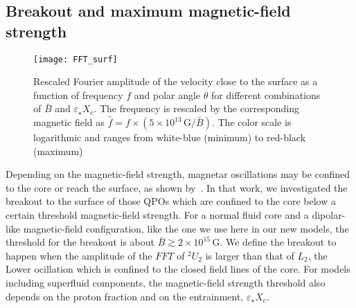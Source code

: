 \documentclass[useAMS,usenatbib]{mnras}
\begin{document}
\subsection{Breakout and maximum magnetic-field strength}
\label{sec_breakout}

\begin{figure*}
\texttt{[image: FFT\_surf]}
\caption{Rescaled Fourier amplitude of the velocity close to the surface as a 
function of frequency $f$ and polar angle $\theta$ for different combinations 
of 
$\bar B$ and $\varepsilon_\star X_c$. The frequency is rescaled by the 
corresponding magnetic field as $\hat f = f\times(5\times10^{13}\,\mathrm{G} / \bar B)$. 
The color scale is logarithmic and ranges from white-blue
(minimum) to red-black (maximum)}
\label{fig_FFT_surf}
\end{figure*}

Depending on the magnetic-field strength, magnetar oscillations may be confined 
to the core or reach the surface, as shown by~\cite{Gabler2012}. In that work, 
we 
investigated the breakout to the surface of those QPOs which are confined to 
the core below a certain threshold magnetic-field strength. For a normal fluid 
core and a dipolar-like magnetic-field configuration, like the one we use here 
in our new models, the threshold for the breakout is about $\bar B
\gtrsim2\times10^{15}\,$G. We define the breakout to happen when the amplitude 
of 
the $FFT$ of $^2U_2$ is larger than that of $L_2$, the Lower ocillation which 
is confined to the closed field lines of the core.  For models including 
superfluid components, the magnetic-field strength threshold also depends on the 
proton fraction and on the entrainment, $\varepsilon_\star X_c$. 
\end{document}
